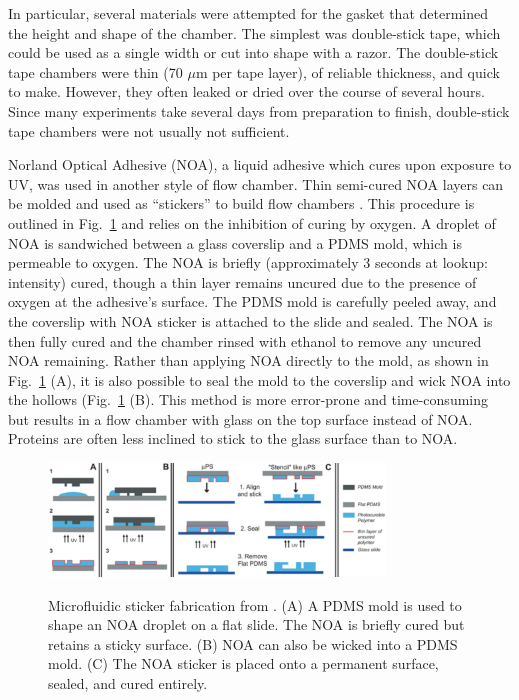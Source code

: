 In particular, several materials were attempted for the gasket that determined the height and shape of the chamber.  The simplest was double-stick tape, which could be used as a single width or cut into shape with a razor.  The double-stick tape chambers were thin (70 $\mu$m per tape layer), of reliable thickness, and quick to make.  However, they often leaked or dried over the course of several hours.  Since many experiments take several days from preparation to finish, double-stick tape chambers were not usually not sufficient.

Norland Optical Adhesive (NOA), a liquid adhesive which cures upon exposure to UV, was used in another style of flow chamber.  Thin semi-cured NOA layers can be molded and used as ``stickers'' to build flow chambers \cite{bartolo08, paustian13}.  This procedure is outlined in Fig.~\ref{fig:stickers} and relies on the inhibition of curing by oxygen.  A droplet of NOA is sandwiched between a glass coverslip and a PDMS mold, which is permeable to oxygen. The NOA is briefly (approximately 3 seconds at lookup: intensity) cured, though a thin layer remains uncured due to the presence of oxygen at the adhesive's surface. The PDMS mold is carefully peeled away, and the coverslip with NOA sticker is attached to the slide and sealed.  The NOA is then fully cured and the chamber rinsed with ethanol to remove any uncured NOA remaining. Rather than applying NOA directly to the mold, as shown in Fig.~\ref{fig:stickers} (A), it is also possible to seal the mold to the coverslip and wick NOA into the hollows (Fig.~\ref{fig:stickers} (B).  This method is more error-prone and time-consuming but results in a flow chamber with glass on the top surface instead of NOA.  Proteins are often less inclined to stick to the glass surface than to NOA.

\begin{figure}
\caption{Microfluidic sticker fabrication from \cite{bartolo08}. (A) A PDMS mold is used to shape an NOA droplet on a flat slide.  The NOA is briefly cured but retains a sticky surface.  (B) NOA can also be wicked into a PDMS mold. (C) The NOA sticker is placed onto a permanent surface, sealed, and cured entirely.}
\centering
\includegraphics[width=0.8\textwidth]{figs/ch03/sticker-bartolo.pdf}
\label{fig:stickers}
\end{figure}

